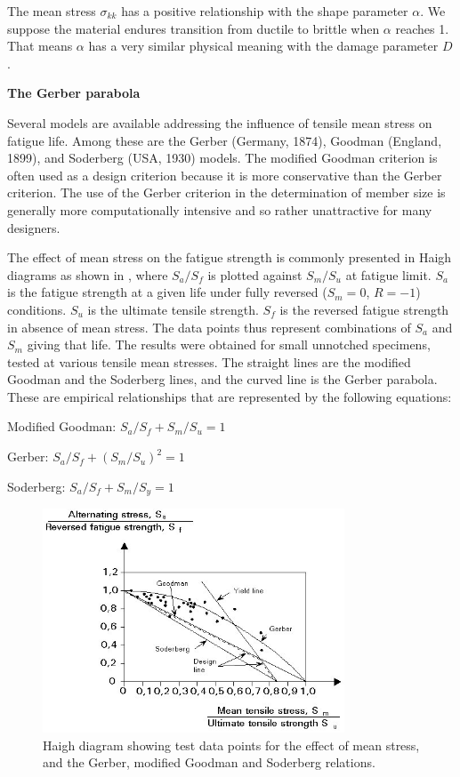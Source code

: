 The mean stress $\sigma_{kk}$ has a positive relationship with the shape parameter $\alpha$. We suppose the material endures transition from ductile to brittle when $\alpha$ reaches 1. That means $\alpha$ has a very similar physical meaning with the damage parameter $D$.

\vspace{6pt}
\textbf{The Gerber parabola}
\vspace{6pt}

Several models are available addressing the influence of tensile mean stress on fatigue life. Among these are the Gerber (Germany, 1874), Goodman (England, 1899), and Soderberg (USA, 1930) models.  The modified Goodman criterion is often used as a design criterion because it is more conservative than the Gerber criterion. The use of the Gerber criterion in the determination of member size is generally more computationally  intensive and so rather unattractive for many designers.

The effect of mean stress on the fatigue strength is commonly presented in Haigh diagrams as shown in , where $S_a / S_f$ is plotted against $S_m / S_u$ at fatigue limit. $S_a$ is the fatigue strength at a given life under fully reversed ($S_m = 0$, $R = -1$) conditions. $S_u$ is the ultimate tensile strength. $S_f$ is the reversed fatigue strength in absence of mean stress. The data points thus represent combinations of $S_a$ and $S_m$ giving that life. The results were obtained for small unnotched specimens, tested at various tensile mean stresses. The straight lines are the modified Goodman and the Soderberg lines, and the curved line is the Gerber parabola. These are empirical relationships that are represented by the following equations:

\vspace{6pt}
Modified Goodman: $S_a/S_f + S_m/S_u = 1$

\vspace{6pt}
Gerber: $S_a/ S_f + (S_m/ S_u)^2 = 1$

\vspace{6pt}
Soderberg: $S_a/S_f+S_m/S_y=1$

\begin{figure}[h!]
	\centering
	\includegraphics[width=0.8\textwidth]{figures//Gerber.png} 
	\caption{Haigh diagram showing test data points for the effect of mean stress, and the Gerber, modified Goodman and Soderberg relations.}
	\label{haigh}
\end{figure}

